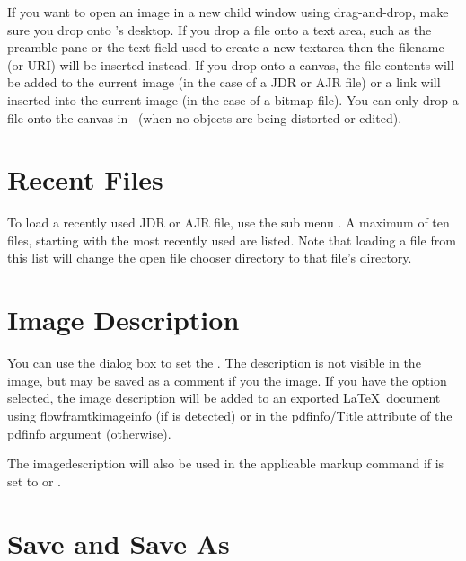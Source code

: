 If you want to open an image in a new child window using \gls{drag-and-drop},
make sure you drop onto \FlowframTk's desktop. If you drop a file onto a
text area, such as the preamble pane or the text field used to
create a new \gls{textarea} then the filename (or URI) will be
inserted instead. If you drop onto a \gls{canvas}, the file contents
will be added to the current image (in the case of a \gls{JDR} or
\gls{AJR} file) or a link will inserted into the current image (in the
case of a \gls{bitmap} file). You can only drop a file onto the
\gls{canvas} in \selectmode\ (when no objects are being distorted or
edited).

\section{Recent Files}\label{sec:recentfiles}


To load a recently used \gls{JDR} or \gls{AJR} file, use the sub
menu . A maximum of ten files, starting with the
most recently used are listed. Note that loading a file from this
list will change the open file chooser directory to that file's
directory.

\section{Image Description}\label{sec:imagedescription}


You can use the  dialog box to set the
. The description is not visible in the image,
but may be saved as a comment if you  the image. If
you have the  option selected,
the image description will be added to an exported \LaTeX\ document
using \gls{flowframtkimageinfo} (if  is
detected) or in the \gls{pdfinfo/Title} attribute of the
\gls{pdfinfo} argument (otherwise).

The \gls{imagedescription} will also be used in the applicable
markup command if  is set to
 or .


\section{Save and Save As}\label{sec:saveimage}

